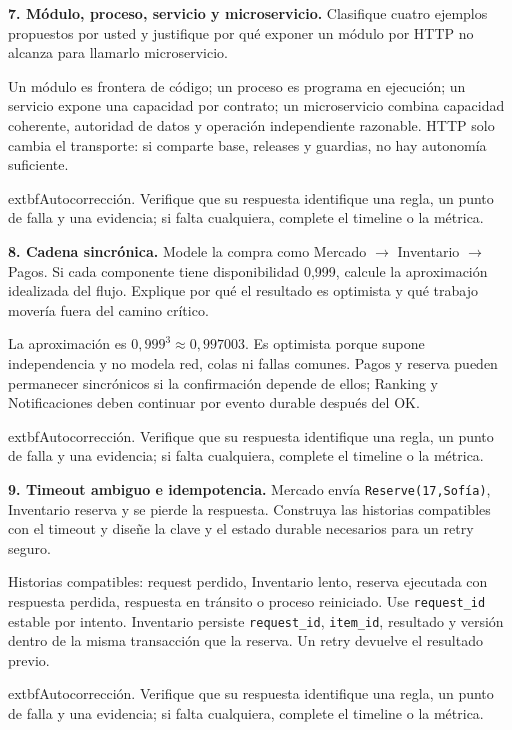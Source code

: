 \documentclass[variant=guiaresuelta,cover=institutional,mode=screen]{ua-engineering-v6-article}
\begin{document}
\begin{uaexercise}
\textbf{7. Módulo, proceso, servicio y microservicio.} Clasifique cuatro ejemplos propuestos por usted y justifique por qué exponer un módulo por HTTP no alcanza para llamarlo microservicio.
\end{uaexercise}
\begin{uaanswer}
Un módulo es frontera de código; un proceso es programa en ejecución; un servicio expone una capacidad por contrato; un microservicio combina capacidad coherente, autoridad de datos y operación independiente razonable. HTTP solo cambia el transporte: si comparte base, releases y guardias, no hay autonomía suficiente.
\par\smallskip	extbf{Autocorrección.} Verifique que su respuesta identifique una regla, un punto de falla y una evidencia; si falta cualquiera, complete el timeline o la métrica.
\end{uaanswer}
\begin{uaexercise}
\textbf{8. Cadena sincrónica.} Modele la compra como Mercado $\rightarrow$ Inventario $\rightarrow$ Pagos. Si cada componente tiene disponibilidad 0,999, calcule la aproximación idealizada del flujo. Explique por qué el resultado es optimista y qué trabajo movería fuera del camino crítico.
\end{uaexercise}
\begin{uaanswer}
La aproximación es $0{,}999^3\approx0{,}997003$. Es optimista porque supone independencia y no modela red, colas ni fallas comunes. Pagos y reserva pueden permanecer sincrónicos si la confirmación depende de ellos; Ranking y Notificaciones deben continuar por evento durable después del OK.
\par\smallskip	extbf{Autocorrección.} Verifique que su respuesta identifique una regla, un punto de falla y una evidencia; si falta cualquiera, complete el timeline o la métrica.
\end{uaanswer}
\begin{uaexercise}
\textbf{9. Timeout ambiguo e idempotencia.} Mercado envía \texttt{Reserve(17,Sofía)}, Inventario reserva y se pierde la respuesta. Construya las historias compatibles con el timeout y diseñe la clave y el estado durable necesarios para un retry seguro.
\end{uaexercise}
\begin{uaanswer}
Historias compatibles: request perdido, Inventario lento, reserva ejecutada con respuesta perdida, respuesta en tránsito o proceso reiniciado. Use \texttt{request\_id} estable por intento. Inventario persiste \texttt{request\_id}, \texttt{item\_id}, resultado y versión dentro de la misma transacción que la reserva. Un retry devuelve el resultado previo.
\par\smallskip	extbf{Autocorrección.} Verifique que su respuesta identifique una regla, un punto de falla y una evidencia; si falta cualquiera, complete el timeline o la métrica.
\end{uaanswer}
\end{document}
